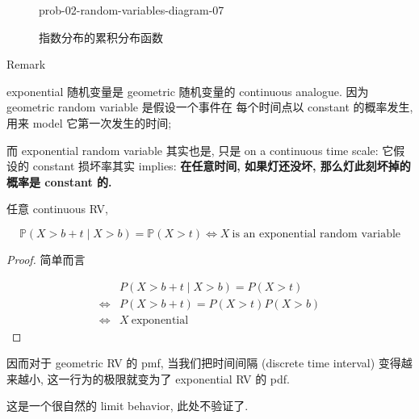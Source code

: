 \begin{figure}[htbp]
\centering
\begin{qldrawing}
\csname prob-02-random-variables-diagram-07\endcsname
\end{qldrawing}

\caption{指数分布的累积分布函数}

\label{fig-prob-02-random-variables-diagram-07}

\end{figure}

\begin{qlremark}{Remark}

exponential 随机变量是 geometric 随机变量的 continuous analogue. 因为 geometric random variable 是假设一个事件在 每个时间点以 constant 的概率发生, 用来 model 它第一次发生的时间;

而 exponential random variable 其实也是, 只是 on a continuous time scale: 它假设的 constant 损坏率其实 implies: \textbf{在任意时间, 如果灯还没坏, 那么灯此刻坏掉的概率是 constant 的.}

\begin{theorem}{}

任意 continuous RV,

\[\mathbb{P}(\mathit{X} > \mathit{b} + \mathit{t} \mid \mathit{X} > \mathit{b}) = \mathbb{P}(\mathit{X} > \mathit{t})\Leftrightarrow\mathit{X}\ \text{is an exponential random variable}\]

\end{theorem}

\begin{proof}

简单而言

\[\begin{matrix}
 & {\mathit{P}(\mathit{X} > \mathit{b} + \mathit{t} \mid \mathit{X} > \mathit{b}) = \mathit{P}(\mathit{X} > \mathit{t})} \\
\Leftrightarrow & {\mathit{P}(\mathit{X} > \mathit{b} + \mathit{t}) = \mathit{P}(\mathit{X} > \mathit{t})\mathit{P}(\mathit{X} > \mathit{b})} \\
\Leftrightarrow & {\mathit{X}\ \text{exponential}}
\end{matrix}\]

\end{proof}

因而对于 geometric RV 的 pmf, 当我们把时间间隔 (discrete time interval) 变得越来越小, 这一行为的极限就变为了 exponential RV 的 pdf.

这是一个很自然的 limit behavior, 此处不验证了.

\end{qlremark}

